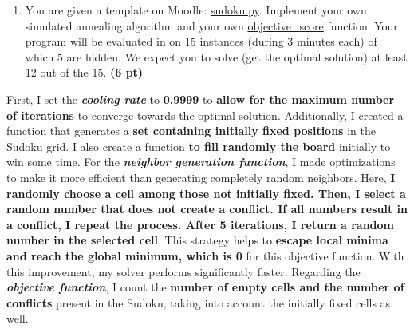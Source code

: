 \documentclass[11pt,a4paper]{report}
\begin{document}
\begin{enumerate}
    \item You are given a template on Moodle: \url{sudoku.py}. Implement your own simulated annealing algorithm and your own \url{objective\_score} function. Your program will be evaluated in on 15 instances (during 3 minutes each) of which 5 are hidden. We expect you to solve (get the optimal solution) at least 12 out of the 15. \textbf{(6 pt)}
\end{enumerate}

\begin{answer}
\scriptsize{First, I set the \textbf{\textit{cooling rate}} to \textbf{0.9999} to \textbf{allow for the maximum number of iterations} to converge towards the optimal solution. Additionally, I created a function that generates a \textbf{set containing initially fixed positions} in the Sudoku grid. I also create a function \textbf{to fill randomly the board} initially to win some time.
For the \textbf{\textit{neighbor generation function}}, I made optimizations to make it more efficient than generating completely random neighbors. Here, \textbf{I randomly choose a cell among those not initially fixed. Then, I select a random number that does not create a conflict. If all numbers result in a conflict, I repeat the process. After 5 iterations, I return a random number in the selected cell}. This strategy helps to \textbf{escape local minima and reach the global minimum, which is 0} for this objective function. With this improvement, my solver performs significantly faster.
Regarding the \textbf{\textit{objective function}}, I count the \textbf{number of empty cells and the number of conflicts} present in the Sudoku, taking into account the initially fixed cells as well.}
\end{answer}
\end{document}
